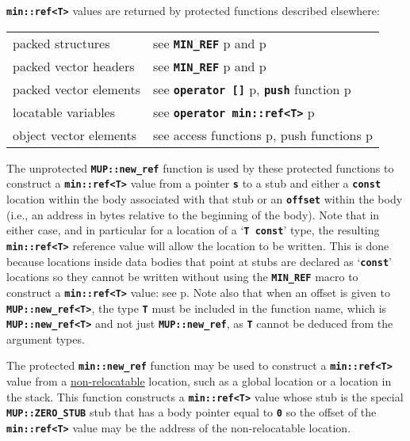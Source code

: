 \documentclass[12pt]{article}
\newcommand{\TT}[1]{{\tt \bfseries #1}}
\newcommand{\pagref}[1]{p\pageref{#1}}
\newcommand{\EOL}{\penalty \exhyphenpenalty}
\begin{document}
\TT{min::ref<T>} values are returned by protected functions described
elsewhere:
\begin{center}
\begin{tabular}{ll}
packed structures & see \TT{MIN\_REF}
    \pagref{MIN_REF} and \pagref{PACKED_STRUCT_MIN_REF} \\
packed vector headers & see \TT{MIN\_REF}
    \pagref{MIN_REF} and \pagref{PACKED_VEC_MIN_REF} \\
packed vector elements	& see \TT{operator []}
    \pagref{MIN::PACKED_VEC_PTR_[]},
    \TT{push} function \pagref{MIN::PACKED_VEC_PUSH} \\
locatable variables	& see \TT{operator min::ref<T>}
    \pagref{LOCATABLE_VAR_REF} \\
object vector elements	& see access functions \pagref{OBJ_VEC_UPDPTR_REF},
			  push functions \pagref{OBJ_VEC_INSPTR_PUSH_REF}
\end{tabular}
\end{center}

The unprotected \TT{MUP::new\_ref} function is used by these
protected functions to construct a \TT{min::\EOL ref<T>} value
from a pointer \TT{s} to a stub and either a \TT{const} location
within the body associated with that stub or an \TT{offset}
within the body
(i.e., an address in bytes relative to the beginning of the body).
Note that in either case, and in particular for a location
of a `\TT{T const}' type, the resulting
\TT{min::\EOL ref<T>} reference value will allow the location
to be written.  This is done because locations inside data bodies
that point at stubs are declared as `\TT{const}' locations
so they cannot be written without using
the \TT{MIN\_\EOL REF} macro to construct a
\TT{min::\EOL ref<T>} value: see \pagref{MIN_REF_USAGE}.
Note also that when an offset is given to
\TT{MUP::\EOL new\_\EOL ref<T>}, the type \TT{T}
must be included in the function name,
which is \TT{MUP::\EOL new\_\EOL ref<T>}
and not just \TT{MUP::\EOL new\_\EOL ref}, as \TT{T} cannot
be deduced from the argument types.

The protected \TT{min::new\_ref} function\label{NEW_REF_USAGE}
may be used to construct
a \TT{min::\EOL ref<T>} value from a \underline{non-relocatable} location,
such as a global location or a location in the stack.
This function constructs a \TT{min::\EOL ref<T>} value whose
stub is the special \TT{MUP::\EOL ZERO\_\EOL STUB} stub that
has a body pointer equal to \TT{0} so the offset of the
\TT{min::\EOL ref<T>} value may be the address of the
non-relocatable location.
\end{document}
